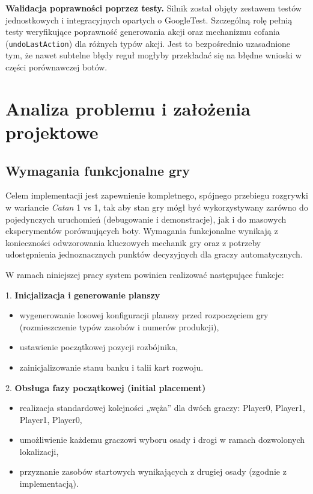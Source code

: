\documentclass[polish,inz,longabstract]{iithesis}
\begin{document}
\textbf{Walidacja poprawności poprzez testy.} Silnik został objęty zestawem testów jednostkowych i integracyjnych opartych o GoogleTest. Szczególną rolę pełnią testy weryfikujące poprawność generowania akcji oraz mechanizmu cofania \newline (\texttt{undoLastAction}) dla różnych typów akcji. Jest to bezpośrednio uzasadnione tym, że nawet subtelne błędy reguł mogłyby przekładać się na błędne wnioski w części porównawczej botów.

\chapter{Analiza problemu i założenia projektowe}
\section{Wymagania funkcjonalne gry}

Celem implementacji jest zapewnienie kompletnego, spójnego przebiegu rozgrywki w wariancie \textit{Catan} 1 vs 1, tak aby stan gry mógł być wykorzystywany zarówno do pojedynczych uruchomień (debugowanie i demonstracje), jak i do masowych eksperymentów porównujących boty. Wymagania funkcjonalne wynikają z konieczności odwzorowania kluczowych mechanik gry oraz z potrzeby udostępnienia jednoznacznych punktów decyzyjnych dla graczy automatycznych.

W ramach niniejszej pracy system powinien realizować następujące funkcje:

1. \textbf{Inicjalizacja i generowanie planszy}
\begin{itemize}
\item wygenerowanie losowej konfiguracji planszy przed rozpoczęciem gry (rozmieszczenie typów zasobów i numerów produkcji),
\item ustawienie początkowej pozycji rozbójnika,
\item zainicjalizowanie stanu banku i talii kart rozwoju.
\end{itemize}

2. \textbf{Obsługa fazy początkowej (initial placement)}
\begin{itemize}
\item realizacja standardowej kolejności „węża” dla dwóch graczy: Player0, Player1, Player1, Player0,
\item umożliwienie każdemu graczowi wyboru osady i drogi w ramach dozwolonych lokalizacji,
\item przyznanie zasobów startowych wynikających z drugiej osady (zgodnie z implementacją).
\end{itemize}
\end{document}
